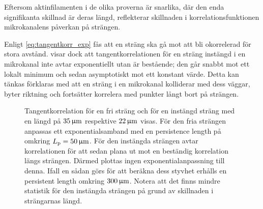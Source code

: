 Eftersom aktinfilamenten i de olika proverna är snarlika, där den enda signifikanta skillnad är deras längd, reflekterar skillnaden i korrelationsfunktionen mikrokanalens påverkan på strängen. %

Enligt \eqref{eq:tangentkorr_exp} fås att en sträng ska gå mot att bli okorrelerad för stora avstånd.  visar dock att tangentkorrelationen för en sträng instängd i en mikrokanal inte avtar exponentiellt utan är bestående; den går snabbt mot ett lokalt minimum och sedan asymptotiskt mot ett konstant värde. %
Detta kan tänkas förklaras med att en sträng i en mikrokanal kolliderar med dess väggar, byter riktning och fortsätter korrelera med punkter långt bort på strängen. 

\begin{figure}
    \centering
    
    \caption{Tangentkorrelation för en fri sträng och för en instängd sträng med en längd på $\unit[35]{\micro m}$ respektive $\unit[22]{\micro m}$ visas. För den fria strängen anpassas ett exponentialsamband med en persistence length på omkring $L_\text{p} = \unit[50]{\micro m}$. För den instängda strängen avtar korrelationen för att sedan plana ut mot en beständig korrelation längs strängen. Därmed plottas ingen exponentialanpassning till denna. Ifall en sådan görs för att beräkna dess styvhet erhålls en persistent length omkring $\unit[300]{\micro m}$. Notera att det finns mindre statistik för den instängda strängen på grund av skillnaden i strängarnas längd.}
    \label{fig:tangentkorr}
\end{figure}


